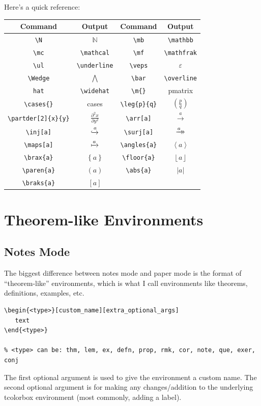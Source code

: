\documentclass[10pt]{article}
\newcommand{\N}{\mathbb{N}}
\newcommand{\mb}{\mathbb}
\newcommand{\mc}{\mathcal}
\newcommand{\mf}{\mathfrak}
\newcommand{\ul}{\underline}
\newcommand{\veps}{\varepsilon}
\newcommand{\Wedge}{\bigwedge\nolimits}
\renewcommand{\bar}{\overline}
\newcommand{\m}[1]{\begin{pmatrix}#1\end{pmatrix}}
\newcommand{\leg}[2]{\left ( \frac{#1}{#2} \right )}
\newcommand{\partder}[3][]{\frac{\partial^{#1}#2}{\partial #3^{#1}}}
\newcommand{\arr}[1][]{\xrightarrow{#1}}
\newcommand{\inj}[1][]{\xhookrightarrow{#1}}
\newcommand{\surj}[1][]{\xrightarrow{#1}\mathrel{\mkern-14mu}\rightarrow}
\newcommand{\maps}[1][]{\xmapsto{#1}}
\newcommand\angles[1]{\left \langle #1 \right \rangle}
\newcommand\brax[1]{\left \{ #1 \right \} }
\newcommand\floor[1]{\left \lfloor #1 \right \rfloor }
\newcommand\paren[1]{\left ( #1 \right ) }
\newcommand\abs[1]{\left | #1 \right | }
\newcommand\braks[1]{\left [ #1 \right ] }
\begin{document}
Here's a quick reference:
\begin{table}[h]
\centering
\begin{tabular}{c|c|c|c}
Command & Output & Command & Output
\\ \hline \verb|\N| & $\N$
& \verb|\mb| & \verb|\mathbb|
\\ \verb|\mc| & \verb|\mathcal|
& \verb|\mf| & \verb|\mathfrak|
\\ \verb|\ul| & \verb|\underline|
& \verb|\veps| & $\veps$
\\ \verb|\Wedge| & $\Wedge$
& \verb|\bar| & \verb|\overline|
\\ \verb|hat| & \verb|\widehat|
& \verb|\m{}| & pmatrix
\\ \verb|\cases{}| & cases
& \verb|\leg{p}{q}| & $\leg{p}{q}$
\\ \verb|\partder[2]{x}{y}| & $\partder[2]{x}{y}$
& \verb|\arr[a]| & $\arr[a]$
\\ \verb|\inj[a]| & $\inj[a]$
& \verb|\surj[a]| & $\surj[a]$
\\ \verb|\maps[a]| & $\maps[a]$
& \verb|\angles{a}| & $\angles{a}$
\\ \verb|\brax{a}| & $\brax{a}$
& \verb|\floor{a}| & $\floor{a}$
\\ \verb|\paren{a}| & $\paren{a}$
& \verb|\abs{a}| & $\abs{a}$
\\ \verb|\braks{a}| & $\braks{a}$
\end{tabular}
\end{table}

\section{Theorem-like Environments}
\subsection{Notes Mode}
The biggest difference between notes mode and paper mode is the format of ``theorem-like'' environments, which is what I call environments like theorems, definitions, examples, etc.

\begin{lstlisting}[language={[LaTeX]TeX}]
\begin{<type>}[custom_name][extra_optional_args]
   text
\end{<type>}

% <type> can be: thm, lem, ex, defn, prop, rmk, cor, note, que, exer, conj
\end{lstlisting}

The first optional argument is used to give the environment a custom name. The second optional argument is for making any changes/addition to the underlying tcolorbox environment (most commonly, adding a label).
\end{document}
